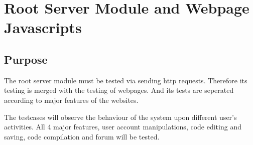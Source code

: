 \section{Root Server Module and Webpage Javascripts}
\subsection{Purpose}
The root server module must be tested via sending http requests. Therefore its testing is merged with the testing of webpages. And its tests are seperated according to major features of the websites.

The testcases will observe the behaviour of the system upon different user's activities. All 4 major features, user account manipulations, code editing and saving, code compilation and forum will be tested.
